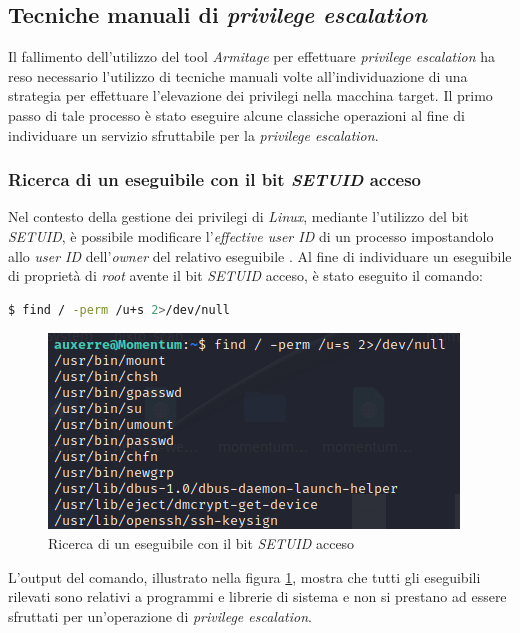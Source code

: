\subsection{Tecniche manuali di \emph{privilege escalation}}
Il fallimento dell'utilizzo del tool \emph{Armitage} per effettuare \emph{privilege escalation} ha reso necessario l'utilizzo di tecniche manuali volte all'individuazione di una strategia per effettuare l'elevazione dei privilegi nella macchina target. Il primo passo di tale processo è stato eseguire alcune classiche operazioni al fine di individuare un servizio sfruttabile per la \emph{privilege escalation}.
\subsubsection{Ricerca di un eseguibile con il bit \emph{SETUID} acceso}
Nel contesto della gestione dei privilegi di \emph{Linux}, mediante l'utilizzo del bit \emph{SETUID}, è possibile modificare l'\emph{effective user ID} di un processo impostandolo allo \emph{user ID} dell'\emph{owner} del relativo eseguibile \cite{carrigan_2020}. Al fine di individuare un eseguibile di proprietà di \emph{root} avente il bit \emph{SETUID} acceso, è stato eseguito il comando:
\begin{lstlisting}[language=bash]
    $ find / -perm /u+s 2>/dev/null
\end{lstlisting}
\begin{figure}[h]
    \centering
    \includegraphics[scale=1]{capitoli/images/suid.png}
    \caption{Ricerca di un eseguibile con il bit \emph{SETUID} acceso}
    \label{fig:suid}
\end{figure}
L'output del comando, illustrato nella figura \ref{fig:suid}, mostra che tutti gli eseguibili rilevati sono relativi a programmi e librerie di sistema e non si prestano ad essere sfruttati per un'operazione di \emph{privilege escalation}. 
